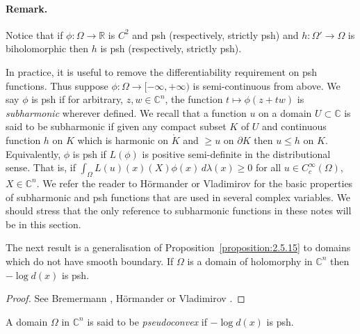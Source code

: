 \paragraph*{Remark.} Notice that if $\phi:\Omega\to\mathbb R$ is $C^2$ and psh (respectively, strictly psh) and $h:\Omega'\to\Omega$ is biholomorphic then $h$ is psh (respectively, strictly psh).

In practice, it is useful to remove the differentiability requirement on psh functions. Thus suppose $\phi:\Omega\to[-\infty,+\infty)$ is semi-continuous from above. We say $\phi$ is psh if for arbitrary, $z,w\in\mathbb C^n$, the function $t\mapsto\phi(z+tw)$ is \emph{subharmonic} wherever defined. We recall that a function $u$ on a domain $U\subset\mathbb C$ is said to be subharmonic if given any compact subset $K$ of $U$ and continuous function $h$ on $K$ which is harmonic on $\mathring K$ and $\geq u$ on $\partial K$ then $u\leq h$ on $K$. Equivalently, $\phi$ is psh if $L(\phi)$ is positive semi-definite in the distributional sense. That is, if $\int_\Omega L(u)(x)(X)\phi(x)\,d\lambda(x)\geq0$ for all $u\in C_c^\infty(\Omega)$, $X\in\mathbb C^n$. We refer the reader to H\"ormander \cite{bib:I:hormander-l:1} or Vladimirov \cite{bib:I:vladimirov-v-s:1} for the basic properties of subharmonic and psh functions that are used in several complex variables. We should stress that the only reference to subharmonic functions in these notes will be in this section.

The next result is a generalisation of Proposition~\ref{proposition:2.5.15} to domains which do not have smooth boundary.
 If $\Omega$ is a domain of holomorphy in $\mathbb C^n$ then $-\log d(x)$ is psh.
\begin{proof}
See Bremermann \cite{bib:I:bremermann-h-j:2}, H\"ormander \cite{bib:I:hormander-l:1} or Vladimirov \cite{bib:I:vladimirov-v-s:1}.
\end{proof}
 A domain $\Omega$ in $\mathbb C^n$ is said to be \emph{pseudoconvex} if $-\log d(x)$ is psh.

